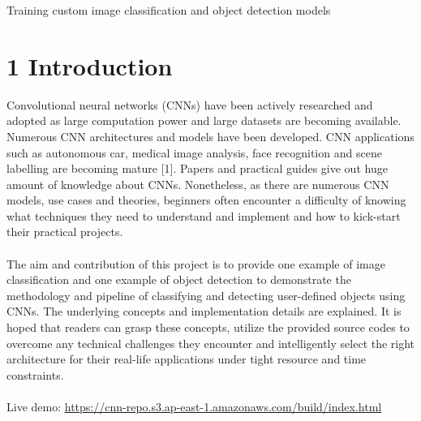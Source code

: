 \documentclass[11pt]{article}
\begin{document}






\begin{center}
\Huge{Training custom image classification and object detection models}
\end{center}

\section*{\large{1 \hspace{10pt} Introduction}}
Convolutional neural networks (CNNs) have been actively researched and adopted as large computation power and large datasets are becoming available. Numerous CNN architectures and models have been developed. CNN applications such as autonomous car, medical image analysis, face recognition and scene labelling are becoming mature [1]. Papers and practical guides give out huge amount of knowledge about CNNs. Nonetheless, as there are numerous CNN models, use cases and theories, beginners often encounter a difficulty of knowing what techniques they need to understand and implement and how to kick-start their practical projects. \\
\\
The aim and contribution of this project is to provide one example of image classification and one example of object detection to demonstrate the methodology and pipeline of classifying and detecting user-defined objects using CNNs. The underlying concepts and implementation details are explained. It is hoped that readers can grasp these concepts, utilize the provided source codes to overcome any technical challenges they encounter and intelligently select the right architecture for their real-life applications under tight resource and time constraints. \\
\\
Live demo: \href{https://cnn-repo.s3.ap-east-1.amazonaws.com/build/index.html}{https://cnn-repo.s3.ap-east-1.amazonaws.com/build/index.html}
\end{document}
